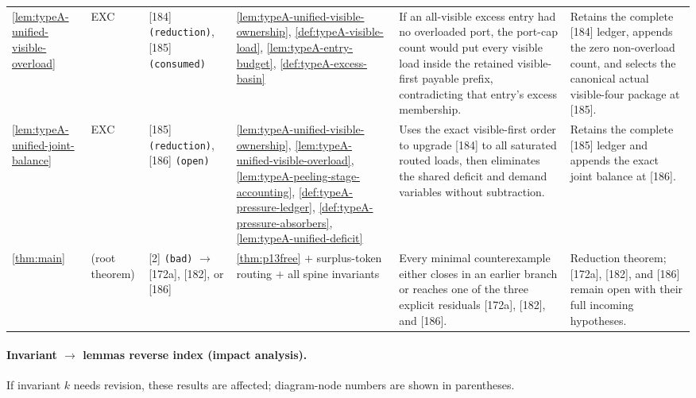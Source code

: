 \documentclass[11pt]{article}
\begin{document}
{\begin{longtable}{L{0.10\textwidth} C{0.045\textwidth} L{0.13\textwidth} L{0.135\textwidth} L{0.28\textwidth} L{0.20\textwidth}}
\cref{lem:typeA-unified-visible-overload} & EXC & [184] \texttt{(reduction)}, [185] \texttt{(consumed)} & \cref{lem:typeA-unified-visible-ownership}, \cref{def:typeA-visible-load}, \cref{lem:typeA-entry-budget}, \cref{def:typeA-excess-basin} & If an all-visible excess entry had no overloaded port, the port-cap count would put every visible load inside the retained visible-first payable prefix, contradicting that entry's excess membership. & Retains the complete [184] ledger, appends the zero non-overload count, and selects the canonical actual visible-four package at [185]. \\
\cref{lem:typeA-unified-joint-balance} & EXC & [185] \texttt{(reduction)}, [186] \texttt{(open)} & \cref{lem:typeA-unified-visible-ownership}, \cref{lem:typeA-unified-visible-overload}, \cref{lem:typeA-peeling-stage-accounting}, \cref{def:typeA-pressure-ledger}, \cref{def:typeA-pressure-absorbers}, \cref{lem:typeA-unified-deficit} & Uses the exact visible-first order to upgrade [184] to all saturated routed loads, then eliminates the shared deficit and demand variables without subtraction. & Retains the complete [185] ledger and appends the exact joint balance at [186]. \\
\cref{thm:main} & (root theorem) & [2] \texttt{(bad)} $\to$ [172a], [182], or [186] & \cref{thm:p13free} $+$ surplus-token routing $+$ all spine invariants & Every minimal counterexample either closes in an earlier branch or reaches one of the three explicit residuals [172a], [182], and [186]. & Reduction theorem; [172a], [182], and [186] remain open with their full incoming hypotheses. \\
\bottomrule
\end{longtable}
}

\paragraph{Invariant $\to$ lemmas reverse index (impact analysis).}
If invariant $k$ needs revision, these results are affected; diagram-node numbers are shown in parentheses.
\end{document}
